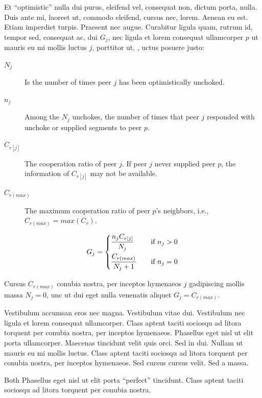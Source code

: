 Et ``optimistic'' nulla dui purus, eleifend vel, consequat non, dictum porta, nulla. Duis ante mi, laoreet ut, commodo eleifend, cursus nec, lorem. Aenean eu est. Etiam imperdiet turpis. Praesent nec augue. Curabitur ligula quam, rutrum id, tempor sed, consequat ac, dui $G_j$, nec ligula et lorem consequat ullamcorper $p$ ut mauris eu mi mollis luctus $j$, porttitor ut, , uctus posuere justo:

\begin{description}
  \item[$N_j$] Is the number of times peer $j$ has been optimistically unchoked.
  \item[$n_j$] Among the $N_j$ unchokes, the number of times that peer $j$ responded with unchoke or supplied segments to peer $p$.
  \item[$C_{r[j]}$] The cooperation ratio of peer $j$. If peer $j$ never supplied peer $p$, the information of $C_{r[j]}$ may not be available.
  \item[$C_{r (max)}$] The maximum cooperation ratio of peer $p$’s neighbors, i.e., $C_{r (max)} = max(C_r)$.
\end{description}

\begin{equation}
\label{unchoke_gain}
 G_j =
  \begin{dcases}
    \frac{n_j C_{r[j]}}{N_j} &\quad \text{if } n_j > 0\\
    \frac{C_{r (max)}}{N_j + 1} &\quad \text{if } n_j = 0
  \end{dcases}
\end{equation}

Cursus $C_{r (max)}$ conubia nostra, per inceptos hymenaeos $j$ gadipiscing mollis massa $N_j = 0$, unc ut dui eget nulla venenatis aliquet $G_j = C_{r (max)}$.

Vestibulum accumsan eros nec magna. Vestibulum vitae dui. Vestibulum nec ligula et lorem consequat ullamcorper. Class aptent taciti sociosqu ad litora torquent per conubia nostra, per inceptos hymenaeos. Phasellus eget nisl ut elit porta ullamcorper. Maecenas tincidunt velit quis orci. Sed in dui. Nullam ut mauris eu mi mollis luctus. Class aptent taciti sociosqu ad litora torquent per conubia nostra, per inceptos hymenaeos. Sed cursus cursus velit. Sed a massa. 

Both  Phasellus eget nisl ut elit porta ``perfect'' tincidunt. Class aptent taciti sociosqu ad litora torquent per conubia nostra.

